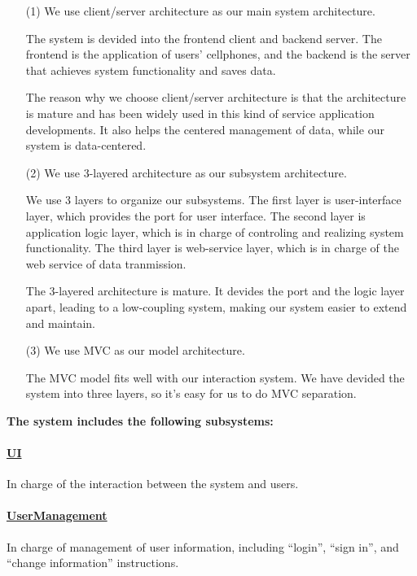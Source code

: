 \documentclass[10pt]{article}
\begin{document}
\begin{itemize}
	\item[(1)] We use client/server architecture as our main system architecture.

	The system is devided into the frontend client and backend server. The frontend is the application of users' cellphones, and the backend is the server that achieves system functionality and saves data.

	The reason why we choose client/server architecture is that the architecture is mature and has been widely used in this kind of service application developments. It also helps the centered management of data, while our system is data-centered.

	\item[(2)] We use 3-layered architecture as our subsystem architecture.

	We use 3 layers to organize our subsystems. The first layer is user-interface layer, which provides the port for user interface. The second layer is application logic layer, which is in charge of controling and realizing system functionality. The third layer is web-service layer, which is in charge of the web service of data tranmission.

	The 3-layered architecture is mature. It devides the port and the logic layer apart, leading to a low-coupling system, making our system easier to extend and maintain.

	\item[(3)] We use MVC as our model architecture.
 
	The MVC model fits well with our interaction system. We have devided the system into three layers, so it's easy for us to do MVC separation.
	
\end{itemize}

\textbf{The system includes the following subsystems:}

\paragraph{\underline{UI}} In charge of the interaction between the system and users.

\paragraph{\underline{UserManagement}} In charge of management of user information, including “login”, “sign in”, and “change information” instructions.
\end{document}
